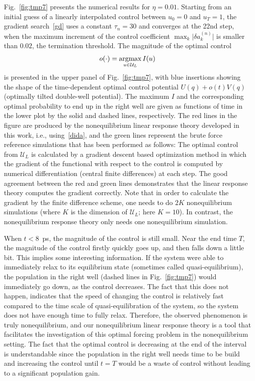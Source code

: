 \documentclass[]{tMPH2e}
\newcommand{\redc}[1]{{\color{red} #1}}
\begin{document}
Fig.~\ref{fig:tmp7} presents the numerical results for $\eta = 0.01$.
Starting from an initial guess of a linearly interpolated control between $u_0 = 0$ and
$u_T = 1$, the gradient search~\eqref{gd} {uses a constant $\tau_n = 30$ and} converges at the 22nd step, when the
maximum increment of the control coefficient $\max_k\vert \delta a^{(n)}_k\vert$
is smaller than $0.02$, the termination threshold.
The magnitude of the optimal control 
\[
o(\cdot) = \mathop{\rm argmax}_{u \in{\mathcal U}_{L}} I(u)
\] 
is presented in the upper panel of Fig.~\ref{fig:tmp7},
with blue insertions showing the shape of the time-dependent optimal control potential 
$U(q) + o(t) V(q)$ (optimally tilted double-well potential). 
The maximum $I$ and the corresponding optimal probability to end up in the right well are
given as functions of time in the lower plot by the solid and dashed lines, respectively.
The red lines in the figure are produced by the nonequilibrium
linear response theory developed in this work, i.e., using~\eqref{dida},
and the green lines represent the brute force reference simulations that has been performed as follows: The optimal control from ${\mathcal U}_{L}$ is calculated by a gradient descent based optimization method in which the gradient of the functional with respect to the control is computed by numerical differentiation (central finite differences) at each step.
The good agreement between the red and green lines demonstrates that 
the linear response theory computes the gradient correctly.
Note that in order to calculate the gradient by the finite difference scheme, one
needs to do $2K$ nonequilibrium simulations
(where $K$ is the dimension of ${\mathcal U}_{L}$; here $K = 10$). In contrast, the nonequilibrium response theory only needs one nonequilibrium simulation.


When $t<8$~\textsf{ps}, the magnitude of the control is still small.  Near the end time $T$, the magnitude of the control firstly
quickly goes up, and then falls down a little bit.  This implies some
interesting information.  If the system were able to immediately relax
to its equilibrium state (sometimes called
quasi-equilibrium), the population in the right well (dashed lines in
Fig.~\ref{fig:tmp7}) would immediately go down, as the control
decreases.  The fact that this does not happen, indicates that the
speed of changing the control is relatively fast compared to the 
time scale of quasi-equilibration of the system, so the system does not have enough time to
fully relax. Therefore, the observed phenomenon is truly
nonequilibrium, and our nonequilibrium linear response theory is a
tool that facilitates the investigation of this optimal forcing
problem in the nonequilibrium setting. The fact that the optimal control is decreasing at the end of the interval is understandable since the population in the right well needs time to be build and increasing the control until $t=T$ would be a waste of control without leading to a significant population gain.
\end{document}
